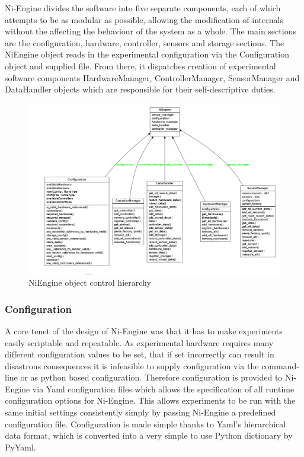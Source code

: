Ni-Engine divides the software into five separate components, each of which attempts to be as modular as possible, allowing the modification of internals without the affecting the behaviour of the system as a whole. The main sections are the configuration, hardware, controller, sensors and storage sections. The NiEngine object reads in the experimental configuration via the Configuration object and supplied file. From there, it dispatches creation of experimental software components HardwareManager, ControllerManager, SensorManager and DataHandler objects which are responsible for their self-descriptive duties.

\begin{figure}[ht!]
\centering
\includegraphics[width=\textwidth]{Figures/NiEngine.png}
\caption{NiEngine object control hierarchy}
\label{fig:NiEngine}
\end{figure}
\subsubsection{Configuration}
A core tenet of the design of Ni-Engine was that it has to make experiments easily scriptable and repeatable. As experimental hardware requires many different configuration values to be set, that if set incorrectly can result in disastrous consequences it is infeasible to supply configuration via the command-line or as python based configuration. Therefore configuration is provided to Ni-Engine via Yaml configuration files which allows the specification of all runtime configuration options for Ni-Engine. This allows experiments to be run with the same initial settings consistently simply by passing Ni-Engine a predefined configuration file. Configuration is made simple thanks to Yaml's hierarchical data format, which is converted into a very simple to use Python dictionary by PyYaml. 
